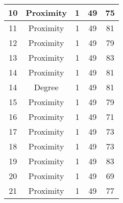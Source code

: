 \documentclass[results.tex]{subfiles}
\begin{document}
\begin{center}
\begin{tabular}{| c || c | c | c | c |}
            \hline
            10                      & Proximity                    & 1                      & 49                      & 75                   \\
            \hline
            11                      & Proximity                    & 1                      & 49                      & 81                   \\
            \hline
            12                      & Proximity                    & 1                      & 49                      & 79                   \\
            \hline
            13                      & Proximity                    & 1                      & 49                      & 83                   \\
            \hline
            14                      & Proximity                    & 1                      & 49                      & 81                   \\
            \hline
            14                      & Degree                       & 1                      & 49                      & 81                   \\
            \hline
            15                      & Proximity                    & 1                      & 49                      & 79                   \\
            \hline
            16                      & Proximity                    & 1                      & 49                      & 71                   \\
            \hline
            17                      & Proximity                    & 1                      & 49                      & 73                   \\
            \hline
            18                      & Proximity                    & 1                      & 49                      & 73                   \\
            \hline
            19                      & Proximity                    & 1                      & 49                      & 83                   \\
            \hline
            20                      & Proximity                    & 1                      & 49                      & 69                   \\
            \hline
            21                      & Proximity                    & 1                      & 49                      & 77                   \\

\end{tabular}
\end{center}
\end{document}
